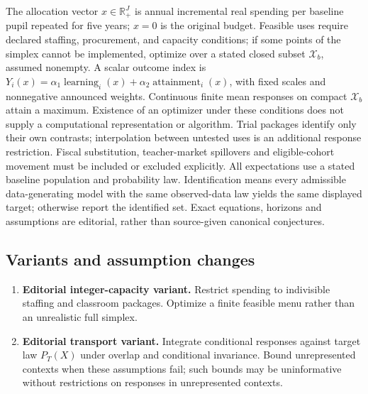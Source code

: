 \documentclass[11pt,a4paper]{article}
\begin{document}
The allocation vector \(x\in\mathbb R_+^J\) is annual incremental real spending per baseline pupil repeated for five years; \(x=0\) is the original budget. Feasible uses require declared staffing, procurement, and capacity conditions; if some points of the simplex cannot be implemented, optimize over a stated closed subset \(\mathcal X_b\), assumed nonempty. A scalar outcome index is \(Y_i(x)=\alpha_1\operatorname{learning}_i(x)+\alpha_2\operatorname{attainment}_i(x)\), with fixed scales and nonnegative announced weights. Continuous finite mean responses on compact \(\mathcal X_b\) attain a maximum. Existence of an optimizer under these conditions does not supply a computational representation or algorithm. Trial packages identify only their own contrasts; interpolation between untested uses is an additional response restriction. Fiscal substitution, teacher-market spillovers and eligible-cohort movement must be included or excluded explicitly. All expectations use a stated baseline population and probability law. Identification means every admissible data-generating model with the same observed-data law yields the same displayed target; otherwise report the identified set. Exact equations, horizons and assumptions are editorial, rather than source-given canonical conjectures.
\subsection*{Variants and assumption changes}
\begin{enumerate}
\item \textbf{Editorial integer-capacity variant.} Restrict spending to indivisible staffing and classroom packages. Optimize a finite feasible menu rather than an unrealistic full simplex.
\item \textbf{Editorial transport variant.} Integrate conditional responses against target law \(P_T(X)\) under overlap and conditional invariance. Bound unrepresented contexts when these assumptions fail; such bounds may be uninformative without restrictions on responses in unrepresented contexts.
\end{enumerate}
\end{document}
